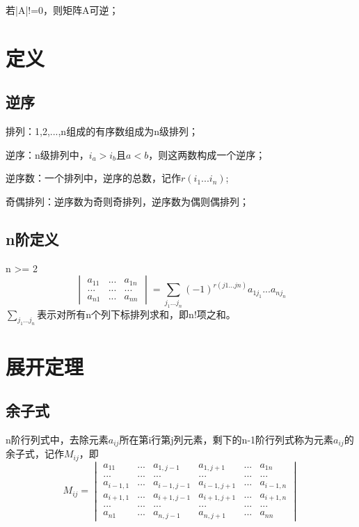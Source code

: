 若|A|!=0，则矩阵A可逆；

\section{定义}

\subsection{逆序}

排列：1,2,...,n组成的有序数组成为n级排列；

逆序：n级排列中，\(i_a > i_b\)且\(a < b\)，则这两数构成一个逆序；

逆序数：一个排列中，逆序的总数，记作\(r(i_1...i_n)\);

奇偶排列：逆序数为奇则奇排列，逆序数为偶则偶排列；


\subsection{n阶定义}

n >= 2
\[
\begin{vmatrix}
a_{11} & ... & a_{1n} \\
... & ... & ... \\
a_{n1} & ... & a_{nn}
\end{vmatrix} = 
\sum_{j_1...j_n} (-1)^{r(j1...jn)}a_{1j_1}...a_{nj_n}
\]
\(\displaystyle \sum_{j_1...j_n}^{}\)表示对所有n个列下标排列求和，即n!项之和。


\section{展开定理}

\subsection{余子式}

n阶行列式中，去除元素\(a_{ij}\)所在第i行第j列元素，剩下的n-1阶行列式称为元素\(a_{ij}\)的余子式，记作\(M_{ij}\)，即
\[M_{ij} = 
\begin{vmatrix}
a_{11} & ... & a_{1,j-1} & a_{1, j+1} & ... & a_{1n} \\
... & ... & ... & ... & ... & ... \\
a_{i-1,1} & ... & a_{i-1,j-1} & a_{i-1, j+1} & ... & a_{i-1,n} \\
a_{i+1,1} & ... & a_{i+1,j-1} & a_{i+1, j+1} & ... & a_{i+1,n} \\
... & ... & ... & ... & ... & ... \\
a_{n1} & ... & a_{n,j-1} & a_{n, j+1} & ... & a_{nn}
\end{vmatrix}
\]


